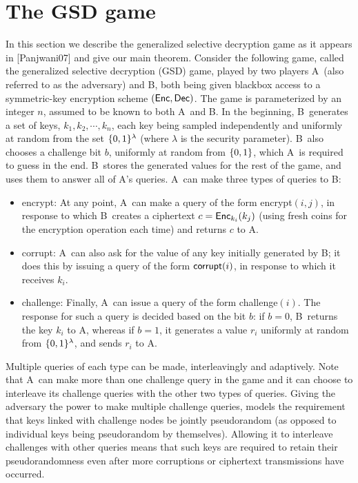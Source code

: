 \documentclass{article}
\def\B{{\sf B}}
\def\A{{\sf A}}
\newcommand{\encrypt}{{\sf encrypt}}
\def\corrupt{{\sf corrupt}}
\def\challenge{{\sf challenge}}
\begin{document}
\section{The GSD game}
In this section we describe the generalized selective decryption game as it appears in [Panjwani07] and give our main theorem. \iffalse which improves on the result of previous work in many cases... \fi  Consider the following game, called the generalized selective decryption
(GSD) game, played by two players \A~(also referred to as the adversary) and \B, both being given blackbox access to a symmetric-key encryption scheme $({\sf Enc},{\sf Dec})$. The game is parameterized by an integer $n$, assumed to be known to both \A~and \B. In the beginning, \B~generates a set of keys, $k_1, k_2, \cdots, k_n$, each key being sampled independently and uniformly at random from the set $\{0,1\}^\lambda$ (where $\lambda$ is the security parameter). \B~also chooses a challenge bit $b $, uniformly at random from $\{0,1\}$, which \A~is required to guess in the end. \B~stores the generated values for the rest of the game, and uses them to answer all of \A's queries. \A~can make three types of queries to \B:
\begin{itemize}
\item \encrypt: At any point, \A~can make a query of the form \encrypt$(i, j)$, in
response to which \B~creates a ciphertext $c={\sf Enc}_{k_i} (k_j)$ (using fresh coins for the encryption operation each time) and returns $c$ to \A.
\item \corrupt: \A~can also ask for the value of any key initially generated by \B; it does this by issuing a query of the form $\corrupt(i)$, in response to which it receives $k_i$.
\item \challenge: Finally, \A~can issue a query of the form \challenge$(i)$. The response for such a query is decided based on the bit $b$: if $b = 0$, \B~returns the key $k_i$ to \A, whereas if $b = 1$, it generates a value $r_i$ uniformly at random
from $\{0,1\}^\lambda$, and sends $r_i$ to \A.
\end{itemize}
Multiple queries of each type can be made, interleavingly and adaptively. Note that \A~can make more than one challenge query in the game and it can choose to interleave
its challenge queries with the other two types of queries. Giving the adversary the power to make multiple
challenge queries, models the requirement that keys linked with challenge nodes be jointly     
pseudorandom (as opposed to individual keys being pseudorandom by themselves). Allowing it
to interleave challenges with other queries means that such keys are required to retain their
pseudorandomness even after more corruptions or ciphertext transmissions have occurred.
\end{document}
